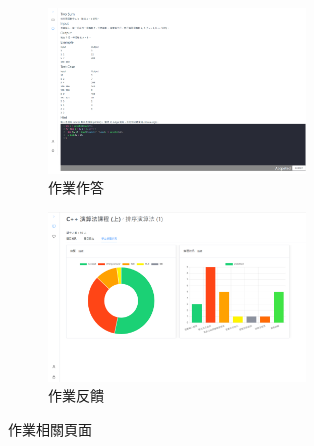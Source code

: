   \begin{figure}[H]
	\begin{subfigure}{0.5\linewidth}
	  \centering
	  \includegraphics[width=0.75\textwidth]{images/homework.png}
	  \caption{作業作答}
	\end{subfigure}
	\begin{subfigure}{0.5\linewidth}
	  \centering
	  \includegraphics[width=0.75\textwidth]{images/feedback.png}
	  \caption{作業反饋}
	\end{subfigure}
	\caption{作業相關頁面}
	\label{fig:homework}
\end{figure}

